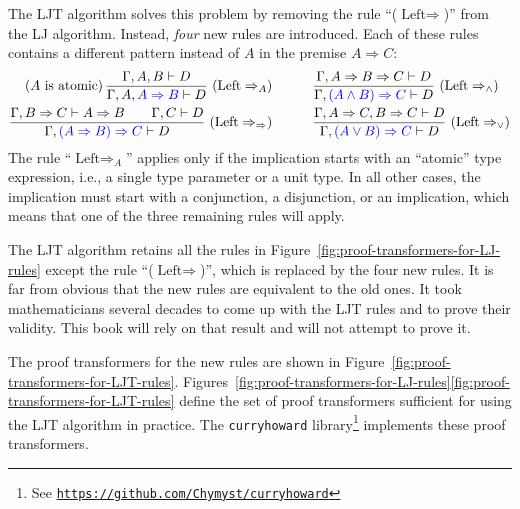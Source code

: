 The LJT algorithm solves this problem by removing the rule \textsf{``}($\text{Left}\Rightarrow$)\textsf{''}
from the LJ algorithm. Instead, \emph{four} new rules are introduced.
Each of these rules contains a different pattern instead of $A$ in
the premise $A\Rightarrow C$:
\begin{align*}
\text{(}A\text{ is atomic)\,}\frac{\Gamma,A,B\vdash D}{\Gamma,A,{\color{blue}A\Rightarrow B}\vdash D}~(\text{Left}\Rightarrow_{A})\qquad & \quad\frac{\Gamma,A\Rightarrow B\Rightarrow C\vdash D}{\Gamma,{\color{blue}(A\wedge B)\Rightarrow C}\vdash D}~(\text{Left}\Rightarrow_{\wedge})\\
\frac{\Gamma,B\Rightarrow C\vdash A\Rightarrow B\quad\quad\Gamma,C\vdash D}{\Gamma,{\color{blue}(A\Rightarrow B)\Rightarrow C}\vdash D}~(\text{Left}\Rightarrow_{\Rightarrow})\qquad & \quad\frac{\Gamma,A\Rightarrow C,B\Rightarrow C\vdash D}{\Gamma,{\color{blue}(A\vee B)\Rightarrow C}\vdash D}~(\text{Left}\Rightarrow_{\vee})
\end{align*}
The rule \textsf{``}$\text{Left}\Rightarrow_{A}$\textsf{''} applies only if the implication
starts with an \textsf{``}atomic\textsf{''} type expression, i.e., a single type parameter
or a unit type. In all other cases, the implication must start with
a conjunction, a disjunction, or an implication, which means that
one of the three remaining rules will apply.

The LJT algorithm retains all the rules in Figure~\ref{fig:proof-transformers-for-LJ-rules}
except the rule \textsf{``}($\text{Left}\Rightarrow$)\textsf{''}, which is replaced
by the four new rules. It is far from obvious that the new rules are
equivalent to the old ones. It took mathematicians several decades
to come up with the LJT rules and to prove their validity. This book
will rely on that result and will not attempt to prove it.

The proof transformers for the new rules are shown in Figure~\ref{fig:proof-transformers-for-LJT-rules}.
Figures~\ref{fig:proof-transformers-for-LJ-rules}\textendash \ref{fig:proof-transformers-for-LJT-rules}
define the set of proof transformers sufficient for using the LJT
algorithm in practice. The \lstinline!curryhoward!
library\texttt{}\footnote{See \texttt{\href{https://github.com/Chymyst/curryhoward}{https://github.com/Chymyst/curryhoward}}}
implements these proof transformers.

